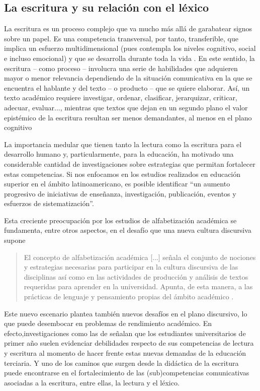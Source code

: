\documentclass{textolivre}
\begin{document}
\subsection{La escritura y su relación con el léxico}\label{sec-la-escr}
La escritura es un proceso complejo que va mucho más allá de garabatear
signos sobre un papel. Es una competencia transversal, por tanto, transferible,
que implica un esfuerzo multidimensional (pues contempla los niveles cognitivo,
social e incluso emocional) y que se desarrolla durante toda la vida \cite{Balta2018}.
En este sentido, la escritura – como proceso – involucra una serie de
habilidades que adquieren mayor o menor relevancia dependiendo de la situación
comunicativa en la que se encuentra el hablante y del texto – o producto – que
se quiere elaborar. Así, un texto académico requiere investigar, ordenar,
clasificar, jerarquizar, criticar, adecuar, evaluar..., mientras que textos que
dejan en un segundo plano el valor epistémico de la escritura resultan ser menos
demandantes, al menos en el plano cognitivo \cite{cantis2013,navarro}

La importancia medular que tienen tanto la lectura como la escritura para
el desarrollo humano y, particularmente, para la educación, ha motivado una
considerable cantidad de investigaciones sobre estrategias que permitan
fortalecer estas competencias. Si nos enfocamos en los estudios realizados en
educación superior en el ámbito latinoamericano, es posible identificar “un
aumento progresivo de iniciativas de enseñanza, investigación, publicación,
eventos y esfuerzos de sistematización”\cite{Navarro2016}.

Esta creciente preocupación por los estudios de alfabetización académica
se fundamenta, entre otros aspectos, en el desafío que una nueva cultura
discursiva supone
\begin{quote}
El concepto de alfabetización académica [...] señala el conjunto de nociones
y estrategias necesarias para participar en la cultura discursiva de las
disciplinas así como en las actividades de producción y análisis de textos
requeridas para aprender en la universidad. Apunta, de esta manera, a las
prácticas de lenguaje y pensamiento propias del ámbito académico \cite[p. 410]{cantis2003}.
\end{quote}

Este nuevo escenario plantea también nuevos desafíos en el plano discursivo,
lo que puede desembocar en problemas de rendimiento académico. En
efecto,investigaciones como las de \textcite{Ayala2019,ValdsLen2020} 
señalan que los estudiantes universitarios de primer año suelen evidenciar
debilidades respecto de sus competencias de lectura y escritura al momento de
hacer frente estas nuevas demandas de la educación terciaria. Y uno de los
caminos que surgen desde la didáctica de la escritura puede encontrarse en el
fortalecimiento de las (sub)competencias comunicativas asociadas a la escritura,
entre ellas, la lectura y el léxico.
\end{document}
